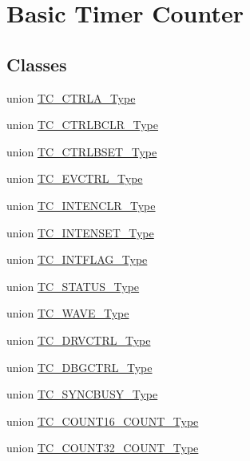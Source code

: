 \hypertarget{group___s_a_m_l21___t_c}{}\section{Basic Timer Counter}
\label{group___s_a_m_l21___t_c}
\subsection*{Classes}
\begin{DoxyCompactItemize}
\item 
union \hyperlink{union_t_c___c_t_r_l_a___type}{T\+C\+\_\+\+C\+T\+R\+L\+A\+\_\+\+Type}
\item 
union \hyperlink{union_t_c___c_t_r_l_b_c_l_r___type}{T\+C\+\_\+\+C\+T\+R\+L\+B\+C\+L\+R\+\_\+\+Type}
\item 
union \hyperlink{union_t_c___c_t_r_l_b_s_e_t___type}{T\+C\+\_\+\+C\+T\+R\+L\+B\+S\+E\+T\+\_\+\+Type}
\item 
union \hyperlink{union_t_c___e_v_c_t_r_l___type}{T\+C\+\_\+\+E\+V\+C\+T\+R\+L\+\_\+\+Type}
\item 
union \hyperlink{union_t_c___i_n_t_e_n_c_l_r___type}{T\+C\+\_\+\+I\+N\+T\+E\+N\+C\+L\+R\+\_\+\+Type}
\item 
union \hyperlink{union_t_c___i_n_t_e_n_s_e_t___type}{T\+C\+\_\+\+I\+N\+T\+E\+N\+S\+E\+T\+\_\+\+Type}
\item 
union \hyperlink{union_t_c___i_n_t_f_l_a_g___type}{T\+C\+\_\+\+I\+N\+T\+F\+L\+A\+G\+\_\+\+Type}
\item 
union \hyperlink{union_t_c___s_t_a_t_u_s___type}{T\+C\+\_\+\+S\+T\+A\+T\+U\+S\+\_\+\+Type}
\item 
union \hyperlink{union_t_c___w_a_v_e___type}{T\+C\+\_\+\+W\+A\+V\+E\+\_\+\+Type}
\item 
union \hyperlink{union_t_c___d_r_v_c_t_r_l___type}{T\+C\+\_\+\+D\+R\+V\+C\+T\+R\+L\+\_\+\+Type}
\item 
union \hyperlink{union_t_c___d_b_g_c_t_r_l___type}{T\+C\+\_\+\+D\+B\+G\+C\+T\+R\+L\+\_\+\+Type}
\item 
union \hyperlink{union_t_c___s_y_n_c_b_u_s_y___type}{T\+C\+\_\+\+S\+Y\+N\+C\+B\+U\+S\+Y\+\_\+\+Type}
\item 
union \hyperlink{union_t_c___c_o_u_n_t16___c_o_u_n_t___type}{T\+C\+\_\+\+C\+O\+U\+N\+T16\+\_\+\+C\+O\+U\+N\+T\+\_\+\+Type}
\item 
union \hyperlink{union_t_c___c_o_u_n_t32___c_o_u_n_t___type}{T\+C\+\_\+\+C\+O\+U\+N\+T32\+\_\+\+C\+O\+U\+N\+T\+\_\+\+Type}

\end{DoxyCompactItemize}
